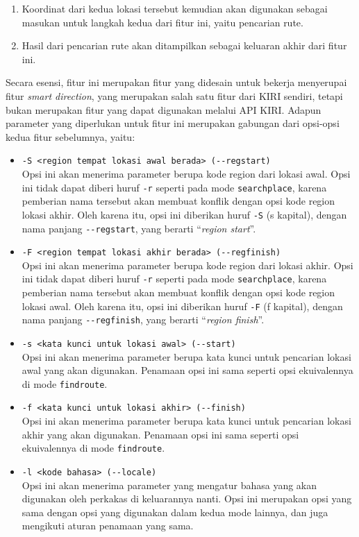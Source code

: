 \begin{itemize}
\begin{itemize}
\begin{enumerate}
			\item Koordinat \latlon\xspace dari kedua lokasi tersebut kemudian akan digunakan sebagai masukan untuk langkah kedua dari fitur ini, yaitu pencarian rute.
			\item Hasil dari pencarian rute akan ditampilkan sebagai keluaran akhir dari fitur ini.
		\end{enumerate}
		\noindent
		Secara esensi, fitur ini merupakan fitur yang didesain untuk bekerja menyerupai fitur \textit{smart direction}, yang merupakan salah satu fitur dari KIRI sendiri, tetapi bukan merupakan fitur yang dapat digunakan melalui API KIRI. Adapun parameter yang diperlukan untuk fitur ini merupakan gabungan dari opsi-opsi kedua fitur sebelumnya, yaitu:
		
		\begin{itemize}
			\item \verb|-S <region tempat lokasi awal berada> (--regstart)|\\
			Opsi ini akan menerima parameter berupa kode region dari lokasi awal. Opsi ini tidak dapat diberi huruf \verb|-r| seperti pada mode \verb|searchplace|, karena pemberian nama tersebut akan membuat konflik dengan opsi kode region lokasi akhir. Oleh karena itu, opsi ini diberikan huruf \verb|-S| (s kapital), dengan nama panjang \verb|--regstart|, yang berarti ``\textit{region start}''.
			\item \verb|-F <region tempat lokasi akhir berada> (--regfinish)|\\
			Opsi ini akan menerima parameter berupa kode region dari lokasi akhir. Opsi ini tidak dapat diberi huruf \verb|-r| seperti pada mode \verb|searchplace|, karena pemberian nama tersebut akan membuat konflik dengan opsi kode region lokasi awal. Oleh karena itu, opsi ini diberikan huruf \verb|-F| (f kapital), dengan nama panjang \verb|--regfinish|, yang berarti ``\textit{region finish}''.
			\item \verb|-s <kata kunci untuk lokasi awal> (--start)|\\
			Opsi ini akan menerima parameter berupa kata kunci untuk pencarian lokasi awal yang akan digunakan. Penamaan opsi ini sama seperti opsi ekuivalennya di mode \verb|findroute|.
			\item \verb|-f <kata kunci untuk lokasi akhir> (--finish)|\\
			Opsi ini akan menerima parameter berupa kata kunci untuk pencarian lokasi akhir yang akan digunakan. Penamaan opsi ini sama seperti opsi ekuivalennya di mode \verb|findroute|.
			\item \verb|-l <kode bahasa> (--locale)|\\
			Opsi ini akan menerima parameter yang mengatur bahasa yang akan digunakan oleh perkakas di keluarannya nanti. Opsi ini merupakan opsi yang sama dengan opsi yang digunakan dalam kedua mode lainnya, dan juga mengikuti aturan penamaan yang sama.
		\end{itemize}
		
	\end{itemize}
	
\end{itemize}
\vspace{-0.5em} %
